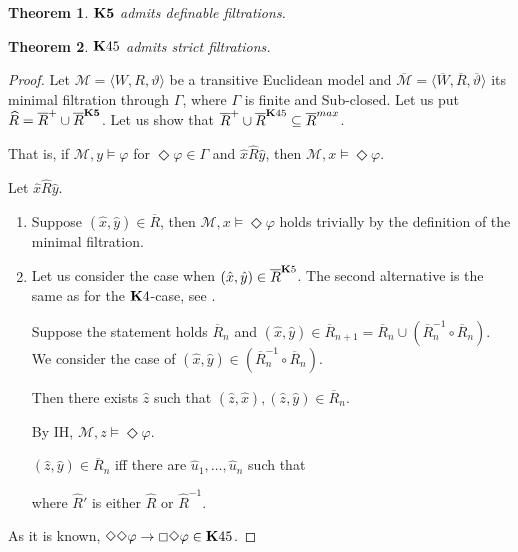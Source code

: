 \documentclass[a4paper]{article}
\theoremstyle{defin}
\theoremstyle{theorem}
\newtheorem{theorem}{Theorem}
\theoremstyle{prop}
\theoremstyle{lemma}
\theoremstyle{fact}
\theoremstyle{ex}
\theoremstyle{col}
\theoremstyle{claim}
\begin{document}
\begin{theorem}
  ${\bf K5}$ admits definable filtrations.
\end{theorem}

\begin{theorem}
  ${\bf K}45$ admits strict filtrations.
\end{theorem}

\begin{proof}
  Let $\mathcal{M} = \langle W, R, \vartheta \rangle$ be a transitive Euclidean model and $\overline{\mathcal{M}} = \langle \overline{W}, \overline{R}, \overline{\vartheta} \rangle$ its minimal filtration through $\Gamma$, where $\Gamma$ is finite and Sub-closed. Let us put $\widehat{R} = \overline{R}^{+} \cup \overline{R}^{\bf K5}$. Let us show that $\overline{R}^{+} \cup \overline{R}^{{\bf K}45} \subseteq \overline{R}^{max}$.

  That is, if $\mathcal{M}, y \models \varphi$ for $\Diamond \varphi \in \Gamma$ and $\hat{x} \widehat{R} \hat{y}$, then $\mathcal{M}, x \models \Diamond \varphi$.

  Let $\hat{x} \widehat{R} \hat{y}$.

  \begin{enumerate}
    \item Suppose $(\hat{x}, \hat{y}) \in \overline{R}$, then $\mathcal{M}, x \models \Diamond \varphi$ holds trivially by the definition of the minimal filtration.
    \item Let us consider the case when $(\hat{x}, \hat{y}) \in \overline{R}^{{\bf K}5}$. The second alternative is the same as for the ${\bf K}4$-case, see \cite[p. 141]{chagrov}.

    Suppose the statement holds $\overline{R}_n$ and $(\hat{x}, \hat{y}) \in \overline{R}_{n + 1} = \overline{R}_n \cup (\overline{R}_n^{-1} \circ \overline{R}_n)$. We consider the case of $(\hat{x}, \hat{y}) \in (\overline{R}_n^{-1} \circ \overline{R}_n)$.

    Then there exists $\hat{z}$ such that $(\hat{z}, \hat{x}), (\hat{z}, \hat{y}) \in \overline{R}_n$.

    By IH, $\mathcal{M}, z \models \Diamond \varphi$.

    $(\hat{z}, \hat{y}) \in \overline{R}_n$ iff there are $\hat{u}_1, \dots, \hat{u}_n$ such that

    \vspace{\baselineskip}

    where $\widehat{R}'$ is either $\widehat{R}$ or $\widehat{R}^{-1}$.
  \end{enumerate}
  As it is known, $\Diamond \Diamond \varphi \to \Box \Diamond \varphi \in {\bf K}45$.


\end{proof}
\end{document}
